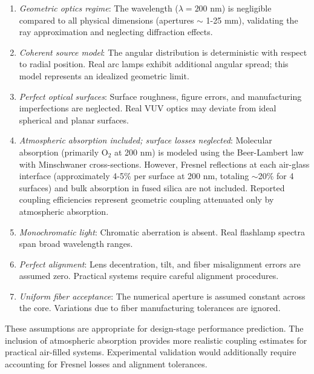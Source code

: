 \begin{enumerate}[leftmargin=*]
    \item \textit{Geometric optics regime}: The wavelength ($\lambda = 200$ nm) is negligible compared to all physical dimensions (apertures $\sim$ 1-25 mm), validating the ray approximation and neglecting diffraction effects.
    
    \item \textit{Coherent source model}: The angular distribution is deterministic with respect to radial position. Real arc lamps exhibit additional angular spread; this model represents an idealized geometric limit.
    
    \item \textit{Perfect optical surfaces}: Surface roughness, figure errors, and manufacturing imperfections are neglected. Real VUV optics may deviate from ideal spherical and planar surfaces.
    
    \item \textit{Atmospheric absorption included; surface losses neglected}: Molecular absorption (primarily O$_2$ at 200 nm) is modeled using the Beer-Lambert law with Minschwaner cross-sections. However, Fresnel reflections at each air-glass interface (approximately 4-5\% per surface at 200 nm, totaling $\sim$20\% for 4 surfaces) and bulk absorption in fused silica are not included. Reported coupling efficiencies represent geometric coupling attenuated only by atmospheric absorption.
    
    \item \textit{Monochromatic light}: Chromatic aberration is absent. Real flashlamp spectra span broad wavelength ranges.
    
    \item \textit{Perfect alignment}: Lens decentration, tilt, and fiber misalignment errors are assumed zero. Practical systems require careful alignment procedures.
    
    \item \textit{Uniform fiber acceptance}: The numerical aperture is assumed constant across the core. Variations due to fiber manufacturing tolerances are ignored.
\end{enumerate}

These assumptions are appropriate for design-stage performance prediction. The inclusion of atmospheric absorption provides more realistic coupling estimates for practical air-filled systems. Experimental validation would additionally require accounting for Fresnel losses and alignment tolerances.

